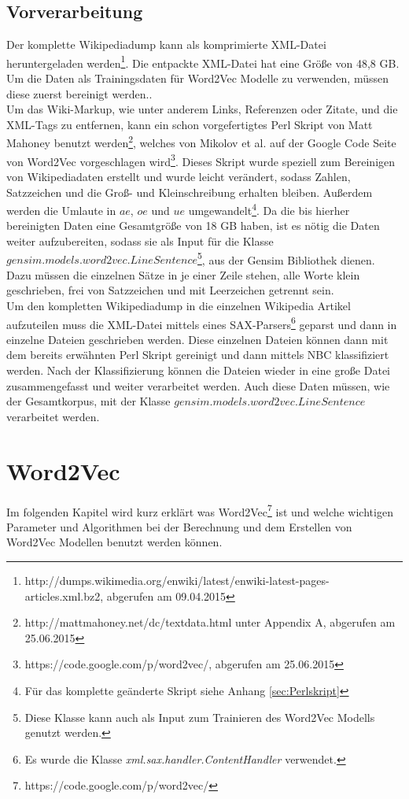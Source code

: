 \documentclass[12pt,a4paper]{report}
\begin{document}
	\section{Vorverarbeitung}
	\label{sec:Vorverarbeitung}
	Der komplette Wikipediadump kann als komprimierte XML-Datei heruntergeladen werden\footnote{http://dumps.wikimedia.org/enwiki/latest/enwiki-latest-pages-articles.xml.bz2, abgerufen am 09.04.2015}. Die entpackte XML-Datei hat eine Größe von 48,8 GB. Um die Daten als Trainingsdaten für Word2Vec Modelle zu verwenden, müssen diese zuerst bereinigt werden..\\		
	Um das Wiki-Markup, wie unter anderem Links, Referenzen oder Zitate, und die XML-Tags zu entfernen, kann ein schon vorgefertigtes Perl Skript von Matt Mahoney benutzt werden\footnote{http://mattmahoney.net/dc/textdata.html unter Appendix A, abgerufen am 25.06.2015}, welches von Mikolov et al. auf der Google Code Seite von Word2Vec vorgeschlagen wird\footnote{https://code.google.com/p/word2vec/, abgerufen am 25.06.2015}. Dieses Skript wurde speziell zum Bereinigen von Wikipediadaten erstellt und wurde leicht verändert, sodass Zahlen, Satzzeichen und die Groß- und Kleinschreibung erhalten bleiben. Außerdem werden die Umlaute in $ae$, $oe$ und $ue$ umgewandelt\footnote{Für das komplette geänderte Skript siehe Anhang \ref{sec:Perlskript}}. Da die bis hierher bereinigten Daten eine Gesamtgröße von 18 GB haben, ist es nötig die Daten weiter aufzubereiten, sodass sie als Input für die Klasse $gensim.models.word2vec.LineSentence$\footnote{Diese Klasse kann auch als Input zum Trainieren des Word2Vec Modells genutzt werden.}, aus der Gensim Bibliothek dienen. Dazu müssen die einzelnen Sätze in je einer Zeile stehen, alle Worte klein geschrieben, frei von Satzzeichen und mit Leerzeichen getrennt sein.\\	
	Um den kompletten Wikipediadump in die einzelnen Wikipedia Artikel aufzuteilen muss die XML-Datei mittels eines SAX-Parsers\footnote{Es wurde die Klasse \textit{xml.sax.handler.ContentHandler} verwendet.} geparst und dann in einzelne Dateien geschrieben werden. Diese einzelnen Dateien können dann mit dem bereits erwähnten Perl Skript gereinigt und dann mittels NBC klassifiziert werden. Nach der Klassifizierung können die Dateien wieder in eine große Datei zusammengefasst und weiter verarbeitet werden. Auch diese Daten müssen, wie der Gesamtkorpus, mit der Klasse $gensim.models.word2vec.LineSentence$ verarbeitet werden.
	
	
\newpage
\chapter{Word2Vec}
Im folgenden Kapitel wird kurz erklärt was Word2Vec\footnote{https://code.google.com/p/word2vec/} ist und welche wichtigen Parameter und Algorithmen bei der Berechnung und dem Erstellen von Word2Vec Modellen benutzt werden können.\\
\end{document}
